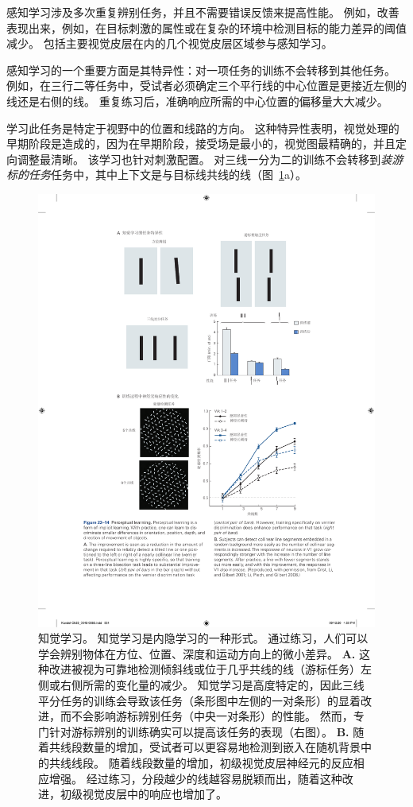 感知学习涉及多次重复辨别任务，并且不需要错误反馈来提高性能。
例如，改善表现出来，例如，在目标刺激的属性或在复杂的环境中检测目标的能力差异的阈值减少。
包括主要视觉皮层在内的几个视觉皮层区域参与感知学习。


感知学习的一个重要方面是其特异性：对一项任务的训练不会转移到其他任务。
例如，在三行二等任务中，受试者必须确定三个平行线的中心位置是更接近左侧的线还是右侧的线。
重复练习后，准确响应所需的中心位置的偏移量大大减少。


学习此任务是特定于视野中的位置和线路的方向。
这种特异性表明，视觉处理的早期阶段是造成的，因为在早期阶段，接受场是最小的，视觉图最精确的，并且定向调整最清晰。
该学习也针对刺激配置。
对三线一分为二的训练不会转移到\textit{装游标的任务}任务中，其中上下文是与目标线共线的线（图~\ref{fig:23_14}a）。


\begin{figure}[htbp]
	\centering
	\includegraphics[width=0.89\linewidth]{chap23/fig_23_14}
	\caption{知觉学习。
		知觉学习是内隐学习的一种形式。
		通过练习，人们可以学会辨别物体在方位、位置、深度和运动方向上的微小差异。
		\textbf{A.} 这种改进被视为可靠地检测倾斜线或位于几乎共线的线（游标任务）左侧或右侧所需的变化量的减少。
		知觉学习是高度特定的，因此三线平分任务的训练会导致该任务（条形图中左侧的一对条形）的显着改进，而不会影响游标辨别任务（中央一对条形）的性能。
		然而，专门针对游标辨别的训练确实可以提高该任务的表现（右图）。
		\textbf{B.} 随着共线段数量的增加，受试者可以更容易地检测到嵌入在随机背景中的共线线段。
		随着线段数量的增加，初级视觉皮层神经元的反应相应增强。
		经过练习，分段越少的线越容易脱颖而出，随着这种改进，初级视觉皮层中的响应也增加了\cite{crist2001learning,li2008learning}。}
	\label{fig:23_14}
\end{figure}


